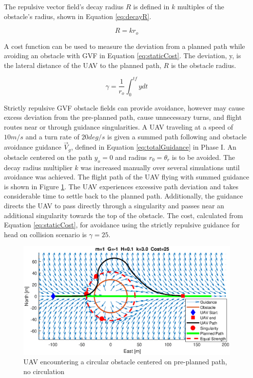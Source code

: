 \documentclass[numbered,pdftex]{ohio-etd}
\begin{document}
 The repulsive vector field's decay radius $R$ is defined in $k$ multiples of the obstacle's radius, shown in Equation \ref{eq:decayR}. 
 
 \begin{equation}
 \label{eq:decayR}
 R = k r_o
 \end{equation}
 
 

 A cost function can be used to measure the deviation from a planned path while avoiding an obstacle with GVF in Equation \ref{eq:staticCost}. The deviation, y, is the lateral distance of the UAV to the planned path, $R$ is the obstacle radius.
 
 \begin{equation}
 \label{eq:staticCost}
 \gamma = \frac{1}{r_o}\int_{0}^{tf}ydt
 \end{equation}
 
 
 Strictly repulsive GVF obstacle fields can provide avoidance, however may cause excess deviation from the pre-planned path, cause unnecessary turns, and flight routes near or through guidance singularities. A UAV traveling at a speed of $10m/s$ and a turn rate of $20 deg/s$ is given a summed path following and obstacle avoidance guidance $\overrightarrow{V}_g$, defined in Equation \ref{eq:totalGuidance} in Phase I. An obstacle centered on the path $y_o=0$ and radius $r_0 = \theta_r$ is to be avoided. The decay radius multiplier $k$ was increased manually over several simulations until avoidance was achieved. The flight path of the UAV flying with summed guidance is shown in Figure \ref{fig:uavPathObstNoCirc}. The UAV experiences excessive path deviation and takes considerable time to settle back to the planned path. Additionally, the guidance directs the UAV to pass directly through a singularity and passes near an additional singularity towards the top of the obstacle. The cost, calculated from Equation \ref{eq:staticCost}, for avoidance using the strictly repulsive guidance for head on collision scenario is $\gamma=25$.
 

\begin{figure}[H]
	\centering
	\includegraphics[trim=0 85 0 85,clip,width=15cm]{PaperFigures/Methods/bruteForceSolveN1V10}
	\caption{UAV encountering a circular obstacle centered on pre-planned path, no circulation}
	\label{fig:uavPathObstNoCirc}
\end{figure}
\end{document}
